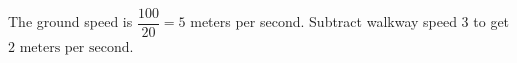 The ground speed is $\dfrac{100}{20}=5$ meters per second. Subtract walkway speed 3 to get $\boxed{2\text{ meters per second}}$.
